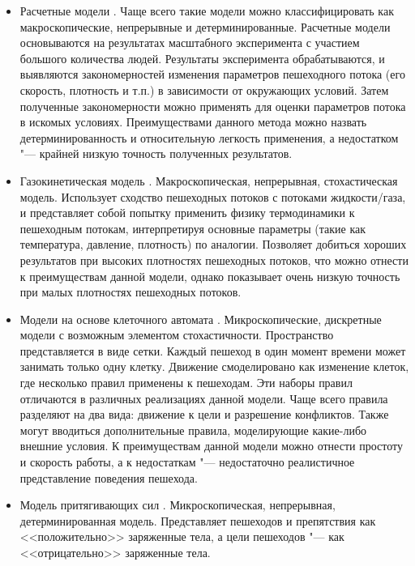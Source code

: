 \begin{itemize}
  \item Расчетные модели \cite{gost_fire_safety}.
        Чаще всего такие модели можно классифицировать как макроскопические, непрерывные и детерминированные.
        Расчетные модели основываются на результатах масштабного эксперимента с участием большого количества людей.
        Результаты эксперимента обрабатываются, и выявляются закономерностей изменения параметров пешеходного потока (его скорость, плотность и т.п.) в зависимости от окружающих условий.
        Затем полученные закономерности можно применять для оценки параметров потока в искомых условиях.
        Преимуществами данного метода можно назвать детерминированность и относительную легкость применения, а недостатком "--- крайней низкую точность полученных результатов.
  \item Газокинетическая модель \cite{helbing_fluid}.
        Макроскопическая, непрерывная, стохастическая модель.
        Использует сходство пешеходных потоков с потоками жидкости/газа, и представляет собой попытку применить физику термодинамики к пешеходным потокам,
        интерпретируя основные параметры (такие как температура, давление, плотность) по аналогии.
        Позволяет добиться хороших результатов при высоких плотностях пешеходных потоков, что можно отнести к преимуществам данной модели,
        однако показывает очень низкую точность при малых плотностях пешеходных потоков.
  \item Модели на основе клеточного автомата \cite{adler_cellular}.
        Микроскопические, дискретные модели с возможным элементом стохастичности.
        Пространство представляется в виде сетки.  Каждый пешеход в один момент времени может занимать только одну клетку.
        Движение смоделировано как изменение клеток, где несколько правил применены к пешеходам. Эти наборы правил отличаются в различных реализациях данной модели.
        Чаще всего правила разделяют на два вида: движение к цели и разрешение конфликтов.
        Также могут вводиться дополнительные правила, моделирующие какие-либо внешние условия.
        К преимуществам данной модели можно отнести простоту и скорость работы, а к недостаткам "--- недостаточно реалистичное представление поведения пешехода.
  \item Модель притягивающих сил \cite{okazakia_magnetic_force}.
        Микроскопическая, непрерывная, детерминированная модель.
        Представляет пешеходов и препятствия как <<положительно>> заряженные тела, а цели пешеходов "--- как <<отрицательно>> заряженные тела.

\end{itemize}
